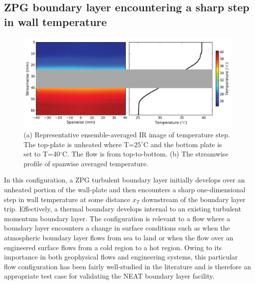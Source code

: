 \subsection{ZPG boundary layer encountering a sharp step in wall temperature}
\begin{figure}[h!]
\centering
\includegraphics[scale=.5]{figures/facility/therm_step_IR_v6.png}
\caption{(a) Representative ensemble-averaged IR image of temperature step. The top-plate is unheated where T=$25^\circ$C and the bottom plate is set to T=40$^\circ$C. The flow is from top-to-bottom. (b) The streamwise profile of spanwise averaged temperature.} 
\label{fig:IR-STEP}
\end{figure}

In this configuration, a ZPG turbulent boundary layer initially develops over an unheated portion of the wall-plate and then encounters a sharp one-dimensional step in wall temperature at some distance $x_T$ downstream of the boundary layer trip. Effectively, a thermal boundary develops internal to an existing turbulent momentum boundary layer. The configuration is relevant to a flow where a boundary layer encounters a change in surface conditions such as when the atmospheric boundary layer flows from sea to land or when the flow over an engineered surface flows from a cold region to a hot region.  Owing to its importance in both geophysical flows and engineering systems, this particular flow configuration has been fairly well-studied in the literature \cite{Antonia1977,Hoffmann1979, Moretti1965} and is therefore an appropriate test case for validating the NEAT boundary layer facility. 

